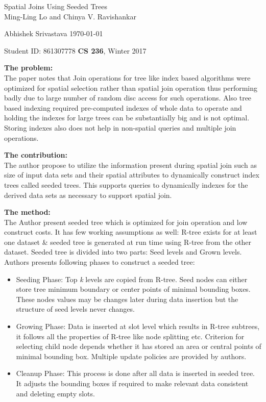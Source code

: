 \documentclass[a4paper,12pt, twoside]{article}
\renewcommand{\maketitle}{%
 	\Large
 	\begin{center}
 	Spatial Joins Using Seeded Trees \\	
 	\normalsize Ming-Ling Lo and Chinya V. Ravishankar
 	\end{center}
 
 	\Large
	Abhishek Srivastava
	\hfill
	\normalsize
	\today
 	\par
 	Student ID: 861307778
 	\hfill
 	\textbf{CS 236}, Winter 2017
 	\par 	
 	\hrulefill
 	\par
 	}
\begin{document}
\thispagestyle{empty}
	
\maketitle

\textbf{The problem:}\\
The paper notes that Join operations for tree like index based algorithms were optimized for spatial selection rather than spatial join operation thus performing badly due to large number of random disc access for such operations. Also tree based indexing required pre-computed indexes of whole data to operate and holding the indexes for large trees can be substantially big and is not optimal. Storing indexes also does not help in non-spatial queries and multiple join operations.  

\textbf{The contribution:}\\
The author propose to utilize the information present during spatial join such as size of input data sets and their spatial attributes to dynamically construct index trees called seeded trees. This supports queries to dynamically indexes for the derived data sets as necessary to support spatial join.

\textbf{The method:}\\
The Author present seeded tree which is optimized for join operation and low construct costs. It has few working assumptions as well: R-tree exists for at least one dataset \& seeded tree is generated at run time using R-tree from the other dataset. Seeded tree is divided into two parts: Seed levels and Grown levels.\\

Authors presents following phases to construct a seeded tree:
\begin{itemize}
	\item Seeding Phase: Top \emph{k} levels are copied from R-tree. Seed nodes can either store tree minimum boundary or center points of minimal bounding boxes. These nodes values may be changes later during data insertion but the structure of seed levels never changes.
	\item Growing Phase: Data is inserted at slot level which results in R-tree subtrees, it follows all the properties of R-tree like node splitting etc. Criterion for selecting child node depends whether it has stored an area or central points of minimal bounding box. Multiple update policies are provided by authors.
	\item Cleanup Phase: This process is done after all data is inserted in seeded tree. It adjusts the bounding boxes if required to make relevant data consistent and deleting empty slots.
\end{itemize}
\end{document}
